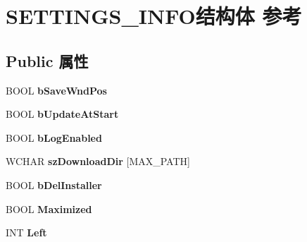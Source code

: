 \hypertarget{struct_s_e_t_t_i_n_g_s___i_n_f_o}{}\section{S\+E\+T\+T\+I\+N\+G\+S\+\_\+\+I\+N\+F\+O结构体 参考}
\label{struct_s_e_t_t_i_n_g_s___i_n_f_o}
\subsection*{Public 属性}
\begin{DoxyCompactItemize}
\item 
\mbox{\label{struct_s_e_t_t_i_n_g_s___i_n_f_o_aeab750092a838dfb8d3aca8c9b9d1afd}} 
B\+O\+OL {\bfseries b\+Save\+Wnd\+Pos}
\item 
\mbox{\label{struct_s_e_t_t_i_n_g_s___i_n_f_o_ad86c0a79516273e3e084cc86ba5544c7}} 
B\+O\+OL {\bfseries b\+Update\+At\+Start}
\item 
\mbox{\label{struct_s_e_t_t_i_n_g_s___i_n_f_o_a3046a3dfba21f27da19231d9215a460c}} 
B\+O\+OL {\bfseries b\+Log\+Enabled}
\item 
\mbox{\label{struct_s_e_t_t_i_n_g_s___i_n_f_o_a0e370bc57d9ebaabcedb8323b5160dfd}} 
W\+C\+H\+AR {\bfseries sz\+Download\+Dir} \mbox{[}M\+A\+X\+\_\+\+P\+A\+TH\mbox{]}
\item 
\mbox{\label{struct_s_e_t_t_i_n_g_s___i_n_f_o_a66dd492560fb8a6b29de21bcfcdebac5}} 
B\+O\+OL {\bfseries b\+Del\+Installer}
\item 
\mbox{\label{struct_s_e_t_t_i_n_g_s___i_n_f_o_ab50d2add00b7669c30847ee14592913a}} 
B\+O\+OL {\bfseries Maximized}
\item 
\mbox{\label{struct_s_e_t_t_i_n_g_s___i_n_f_o_a0d2300ab2685bd82d6ce685e341f4a4d}} 
I\+NT {\bfseries Left}
\item 
\mbox{\label{struct_s_e_t_t_i_n_g_s___i_n_f_o_a8900b613f85ea3fbd6701a500da93303}} 

\end{DoxyCompactItemize}
